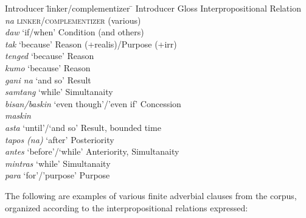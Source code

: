 \ea
\label{bkm:Ref116282225}
\begin{tabbing}
Introducer \hspace{.3cm} \= linker/complementizer \hspace{.4cm}\= \kill
Introducer \>  Gloss \>         Interpropositional Relation \\
\textit{na  } \>  \textsc{linker/complementizer}   (various) \\
\textit{daw  } \>  ‘if/when’  \> Condition (and others) \\
\textit{tak  } \>  ‘because’    \>      Reason (+realis)/Purpose (+irr) \\
\textit{tenged } \>   ‘because’   \>       Reason \\
\textit{kumo  } \>  ‘because’       \>    Reason \\
\textit{gani na } \>   ‘and so’       \>    Result \\
\textit{samtang } \>   ‘while’      \>    Simultanaity \\
\textit{bisan/baskin} \> ‘even though'/'even if’ \>  Concession \\
\textit{maskin}  \\
\textit{asta } \>   ‘until’/‘and so’      \>     Result, bounded time \\
\textit{tapos (na) } \>  ‘after’         \>  Posteriority \\
\textit{antes } \>   ‘before’/‘while’      \>     Anteriority, Simultanaity \\
\textit{mintras } \>   ‘while’ \>          Simultanaity \\
\textit{para  } \>  ‘for’/'purpose'    \>      Purpose
\end{tabbing}
\z

The following are examples of various finite adverbial clauses from the corpus, organized according to the interpropositional relations expressed:

